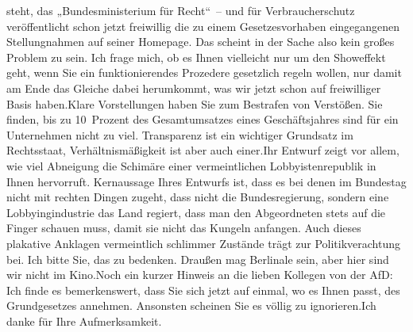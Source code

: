 \documentclass{article}
\begin{document}
steht, das „Bundesministerium für Recht“ – und für Verbraucherschutz veröffentlicht schon jetzt freiwillig die zu einem Gesetzesvorhaben eingegangenen Stellungnahmen auf seiner Homepage. Das scheint in der Sache also kein großes Problem zu sein. Ich frage mich, ob es Ihnen vielleicht nur um den Showeffekt geht, wenn Sie ein funktionierendes Prozedere gesetzlich regeln wollen, nur damit am Ende das Gleiche dabei herumkommt, was wir jetzt schon auf freiwilliger Basis haben.Klare Vorstellungen haben Sie zum Bestrafen von Verstößen. Sie finden, bis zu 10 Prozent des Gesamtumsatzes eines Geschäftsjahres sind für ein Unternehmen nicht zu viel. Transparenz ist ein wichtiger Grundsatz im Rechtsstaat, Verhältnismäßigkeit ist aber auch einer.Ihr Entwurf zeigt vor allem, wie viel Abneigung die Schimäre einer vermeintlichen Lobbyistenrepublik in Ihnen hervorruft. Kernaussage Ihres Entwurfs ist, dass es bei denen im Bundestag nicht mit rechten Dingen zugeht, dass nicht die Bundesregierung, sondern eine Lobbying­industrie das Land regiert, dass man den Abgeordneten stets auf die Finger schauen muss, damit sie nicht das Kungeln anfangen. Auch dieses plakative Anklagen vermeintlich schlimmer Zustände trägt zur Politikverachtung bei. Ich bitte Sie, das zu bedenken. Draußen mag Berlinale sein, aber hier sind wir nicht im Kino.Noch ein kurzer Hinweis an die lieben Kollegen von der AfD: Ich finde es bemerkenswert, dass Sie sich jetzt auf einmal, wo es Ihnen passt, des Grundgesetzes annehmen. Ansonsten scheinen Sie es völlig zu ignorieren.Ich danke für Ihre Aufmerksamkeit.
\end{document}
